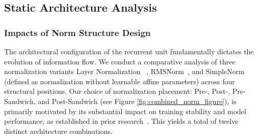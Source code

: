 
\subsection{Static Architecture Analysis}
\label{subsec:Static Architecture Analysis}

    \subsubsection{Impacts of Norm Structure Design}
    The architectural configuration of the recurrent unit fundamentally dictates the evolution of information flow. We conduct a comparative analysis of three normalization variants Layer Normalization ~\citep{ba2016layer}, RMSNorm~\citep{zhang2019root}, and SimpleNorm (defined as normalization without learnable affine parameters) across four structural positions. 
    Our choice of normalization placement: Pre-, Post-, Pre-Sandwich, and Post-Sandwich (see Figure \ref{fig:combined_norm_figure}), is primarily motivated by its substantial impact on training stability and model performance, as established in prior research~\citep{xiong2020layer,bai2021stabilizing}. This yields a total of twelve distinct architecture combinations.

